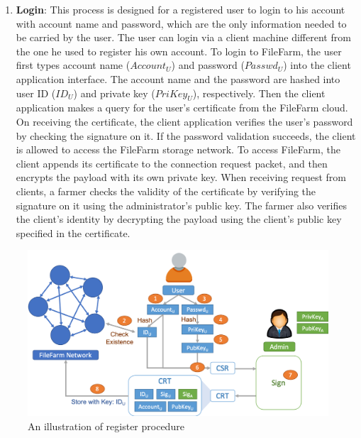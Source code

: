 \begin{enumerate}
  \item \textbf{Login}: This process is designed for a registered user to login to his account with account name and password, which are the only information needed to be carried by the user. The user can login via a client machine different from the one he used to register his own account. To login to FileFarm, the user first types account name ($Account_{U}$) and password ($Passwd_{U}$) into the client application interface. The account name and the password are hashed into user ID ($ID_{U}$) and private key ($PriKey_{U}$), respectively. Then the client application makes a query for the user's certificate from the FileFarm cloud. On receiving the certificate, the client application verifies the user's password by checking the signature on it. If the password validation succeeds, the client is allowed to access the FileFarm storage network. To access FileFarm, the client appends its certificate to the connection request packet, and then encrypts the payload with its own private key. When receiving request from clients, a farmer checks the validity of the certificate by verifying the signature on it using the administrator's public key. The farmer also verifies the client's identity by decrypting the payload using the client's public key specified in the certificate.
\end{enumerate}

\begin{figure}[hbt]
  \centering
    \includegraphics[width=14cm]{figures/access_management_register.png}
    \caption{An illustration of register procedure}
    \label{fig:accessmanagementregister}
\end{figure}
  
